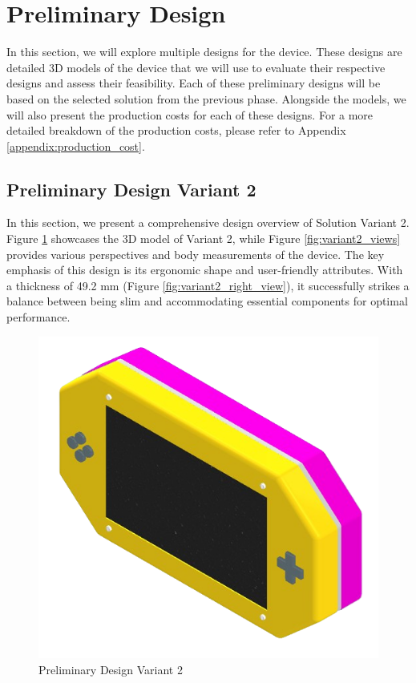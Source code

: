 \section{Preliminary Design}
In this section, we will explore multiple designs for the device. These designs are detailed 3D models of the device that we will use to evaluate their respective designs and assess their feasibility. Each of these preliminary designs will be based on the selected solution from the previous phase. Alongside the models, we will also present the production costs for each of these designs. For a more detailed breakdown of the production costs, please refer to Appendix \ref{appendix:production_cost}.


\subsection{Preliminary Design Variant 2}
\label{subsec:preliminary_design_variant_2}
In this section, we present a comprehensive design overview of Solution Variant 2. Figure \ref{fig:preliminary_design_variant_2} showcases the 3D model of Variant 2, while Figure \ref{fig:variant2_views} provides various perspectives and body measurements of the device. The key emphasis of this design is its ergonomic shape and user-friendly attributes. With a thickness of 49.2 mm (Figure \ref{fig:variant2_right_view}), it successfully strikes a balance between being slim and accommodating essential components for optimal performance.

\begin{figure}[h!]
    \centering
    \includegraphics[height=5 cm]{texs/Part1/chapter4/image/v21.png}
    \caption{Preliminary Design Variant 2}
    \label{fig:preliminary_design_variant_2}
\end{figure}

